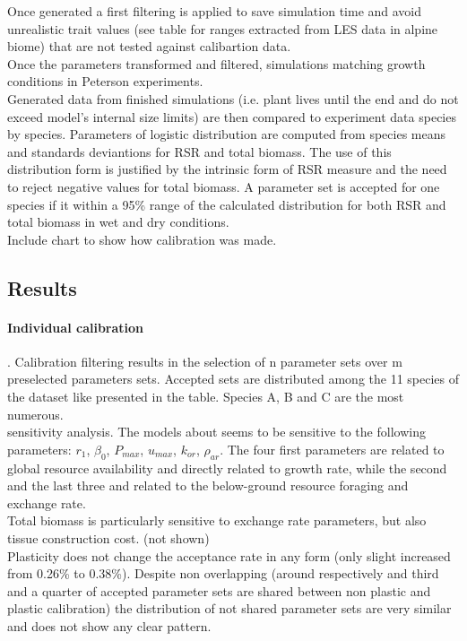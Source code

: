 Once generated a first filtering is applied to save simulation time and avoid unrealistic trait values (see table for ranges extracted from LES data in alpine biome) that are not tested against calibartion data.\\
Once the parameters transformed and filtered, simulations matching growth conditions in Peterson experiments.\\
Generated data from finished simulations (i.e. plant lives until the end and do not exceed model's internal size limits) are then compared to experiment data species by species. Parameters of logistic distribution are computed from species means and standards deviantions for RSR and total biomass. The use of this distribution form is justified by the intrinsic form of RSR measure and the need to reject negative values for total biomass. A parameter set is accepted for one species if it within a 95\% range of the calculated distribution for both RSR and total biomass in wet and dry conditions.\\

Include chart to show how calibration was made.


\subsection{Results}


\paragraph{Individual calibration}. Calibration filtering results in the selection of n parameter sets over m preselected parameters sets. Accepted sets are distributed among the 11 species of the dataset like presented in the table. Species A, B and C are the most numerous.\\
sensitivity analysis. The models about seems to be sensitive to the following parameters: $r_1$, $\beta_0$, $P_{max}$, $u_{max}$, $k_{or}$, $\rho_{ar}$. The four first parameters are related to global resource availability and directly related to growth rate, while the second and the last three and related to the below-ground resource foraging and exchange rate.\\
Total biomass is particularly sensitive to exchange rate parameters, but also tissue construction cost. (not shown)\\

Plasticity does not change the acceptance rate in any form (only slight increased from 0.26\% to 0.38\%). Despite non overlapping (around respectively and third and a quarter of accepted parameter sets are shared between non plastic and plastic calibration) the distribution of not shared parameter sets are very similar and does not show any clear pattern. \\


